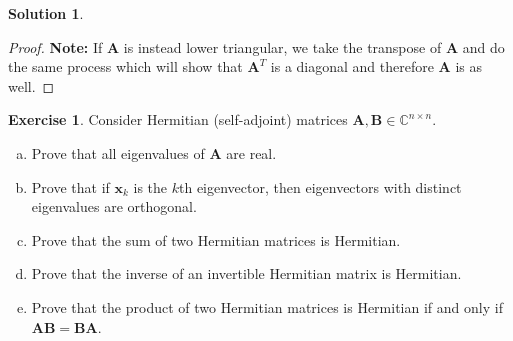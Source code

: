 \documentclass[12pt]{article}
\newcommand{\bbC}{\mathbb{C}}
\renewcommand{\vec}[1]{\mathbf{#1}}
\theoremstyle{definition}
\newtheorem{exer}{Exercise}
\newtheorem{sol}{Solution}
\theoremstyle{remark}
\begin{document}
\begin{sol}
\begin{proof}
\textbf{Note:} If $\vec{A}$ is instead lower triangular, we take the transpose of $\vec{A}$ and do the same process which will show that $\vec{A}^T$ is a diagonal and therefore $\vec{A}$ is as well.
\end{proof}

\end{sol}

\newpage

\begin{exer}
    Consider Hermitian (self-adjoint) matrices $\vec{A}, \vec{B} \in \bbC^{n\times n}$.
    \begin{enumerate}[a.]
        \item Prove that all eigenvalues of $\vec{A}$ are real.
        \item Prove that if $\vec{x}_k$ is the $k$th eigenvector, then eigenvectors with distinct eigenvalues are orthogonal.
        \item Prove that the sum of two Hermitian matrices is Hermitian.
        \item Prove that the inverse of an invertible Hermitian matrix is Hermitian.
        \item Prove that the product of two Hermitian matrices is Hermitian if and only if $\vec{AB} = \vec{BA}$.
    \end{enumerate}
\end{exer}
\end{document}

